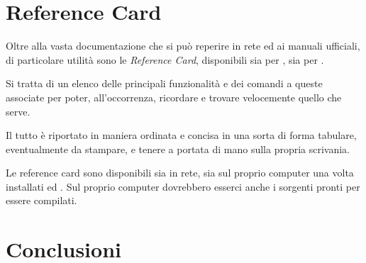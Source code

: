 \documentclass[10pt,a4paper]{article}
\begin{document}
\section{Reference Card}
\label{sec:refcard}

Oltre alla vasta documentazione che si può reperire in rete ed ai
manuali ufficiali, di particolare utilità sono le \emph{Reference
  Card}, disponibili sia per \emacs{}, sia per \auctex{}.

Si tratta di un elenco delle principali funzionalità e dei comandi 
a queste associate per poter, all'occorrenza, ricordare e trovare
velocemente quello che serve.

Il tutto è riportato in maniera ordinata e concisa in una sorta di
forma tabulare, eventualmente  da stampare, e tenere a portata di mano
sulla propria scrivania.

Le reference card sono disponibili sia in rete, sia sul proprio
computer una volta installati \emacs{} ed \auctex. Sul proprio
computer dovrebbero esserci anche i sorgenti pronti per essere compilati.

\section{Conclusioni}
\label{sec:fine}

\textcolor{red!50}{\lipsum[1]}


\end{document}
